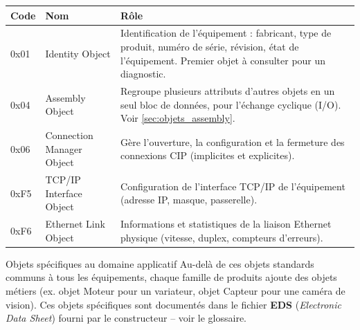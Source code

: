 \begin{center}
    \begin{tabular}{|p{2.3cm}|p{4cm}|p{7.5cm}|}
        \hline
        \textbf{Code} & \textbf{Nom} & \textbf{Rôle} \\
        \hline
        0x01 & Identity Object & Identification de l'équipement : fabricant, type de produit, numéro de série, révision, état de l'équipement. Premier objet à consulter pour un diagnostic. \\
        \hline
        0x04 & Assembly Object & Regroupe plusieurs attributs d'autres objets en un seul bloc de données, pour l'échange cyclique (I/O). Voir \ref{sec:objets_assembly}. \\
        \hline
        0x06 & Connection Manager Object & Gère l'ouverture, la configuration et la fermeture des connexions CIP (implicites et explicites). \\
        \hline
        0xF5 & TCP/IP Interface Object & Configuration de l'interface TCP/IP de l'équipement (adresse IP, masque, passerelle). \\
        \hline
        0xF6 & Ethernet Link Object & Informations et statistiques de la liaison Ethernet physique (vitesse, duplex, compteurs d'erreurs). \\
        \hline
    \end{tabular}
\end{center}

\begin{UPSTIidee}{Objets spécifiques au domaine applicatif}
    Au-delà de ces objets standards communs à tous les équipements, chaque famille de produits ajoute des objets métiers (ex. objet Moteur pour un variateur, objet Capteur pour une caméra de vision). Ces objets spécifiques sont documentés dans le fichier \textbf{EDS} (\emph{Electronic Data Sheet}) fourni par le constructeur -- voir le glossaire.
\end{UPSTIidee}
